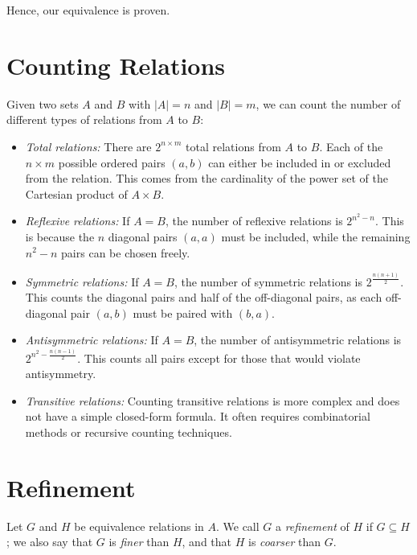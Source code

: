 Hence, our equivalence is proven.

\QED

\section{Counting Relations}

Given two sets \(A\) and \(B\) with \(|A| = n\) and \(|B| = m\), we can count the number of different types of relations from \(A\) to \(B\):

\begin{itemize}

	\item \emph{Total relations:} There are \(2^{n \times m}\) total relations from \(A\) to \(B\). Each of the
	      \(n \times m\) possible ordered pairs \((a, b)\) can either be included in or excluded from the relation. This comes from the cardinality of
	      the power set of the Cartesian product of \(A \times B\).

	\item \emph{Reflexive relations:} If \(A = B\), the number of reflexive relations is \(2^{n^2 - n}\). This is because
	      the \(n\) diagonal pairs \((a, a)\) must be included, while the remaining \(n^2 - n\) pairs can be chosen freely.

	\item \emph{Symmetric relations:} If \(A = B\), the number of symmetric relations is \(2^{\frac{n(n+1)}{2}}\). This counts
	      the diagonal pairs and half of the off-diagonal pairs, as each off-diagonal pair \((a, b)\) must be paired with \((b, a)\).

	\item \emph{Antisymmetric relations:} If \(A = B\), the number of antisymmetric relations is \(2^{n^2 - \frac{n(n-1)}{2}}\).
	      This counts all pairs except for those that would violate antisymmetry.

	\item \emph{Transitive relations:} Counting transitive relations is more complex and does not have a simple closed-form formula.
	      It often requires combinatorial methods or recursive counting techniques.

\end{itemize}

\section{Refinement}

Let \(G\) and \(H\) be equivalence relations in \(A\). We call \(G\) a \emph{refinement} of \(H\) if
\(G \subseteq H\); we also say that \(G\) is \emph{finer} than \(H\), and that \(H\) is \emph{coarser} than \(G\).

